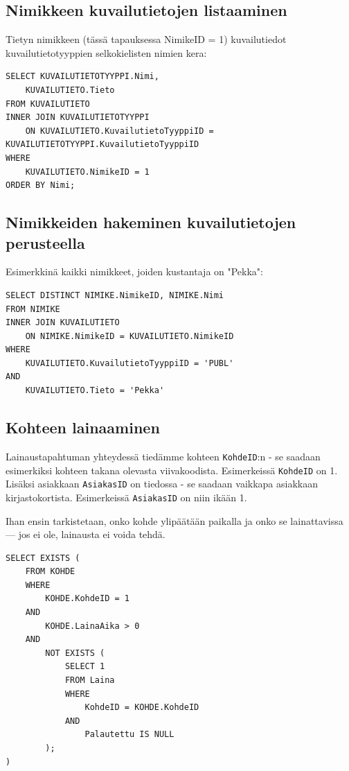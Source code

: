 \documentclass{article}
\begin{document}
\subsection{Nimikkeen kuvailutietojen listaaminen}

Tietyn nimikkeen (tässä tapauksessa NimikeID = 1) kuvailutiedot kuvailutietotyyppien selkokielisten nimien kera:

\begin{lstlisting}
SELECT KUVAILUTIETOTYYPPI.Nimi,
    KUVAILUTIETO.Tieto 
FROM KUVAILUTIETO
INNER JOIN KUVAILUTIETOTYYPPI
    ON KUVAILUTIETO.KuvailutietoTyyppiID = KUVAILUTIETOTYYPPI.KuvailutietoTyyppiID
WHERE
    KUVAILUTIETO.NimikeID = 1
ORDER BY Nimi;
\end{lstlisting}

\subsection{Nimikkeiden hakeminen kuvailutietojen perusteella}

Esimerkkinä kaikki nimikkeet, joiden kustantaja on "Pekka":

\begin{lstlisting}
SELECT DISTINCT NIMIKE.NimikeID, NIMIKE.Nimi
FROM NIMIKE
INNER JOIN KUVAILUTIETO
    ON NIMIKE.NimikeID = KUVAILUTIETO.NimikeID
WHERE
    KUVAILUTIETO.KuvailutietoTyyppiID = 'PUBL'
AND
    KUVAILUTIETO.Tieto = 'Pekka'
\end{lstlisting}

\subsection{Kohteen lainaaminen}

Lainaustapahtuman yhteydessä tiedämme kohteen \texttt{KohdeID}:n - se saadaan esimerkiksi kohteen takana olevasta viivakoodista. Esimerkeissä \texttt{KohdeID} on 1. Lisäksi asiakkaan \texttt{AsiakasID} on tiedossa - se saadaan vaikkapa asiakkaan kirjastokortista. Esimerkeissä \texttt{AsiakasID} on niin ikään 1.

Ihan ensin tarkistetaan, onko kohde ylipäätään paikalla ja onko se lainattavissa --- jos ei ole, lainausta ei voida tehdä.

\begin{lstlisting}
SELECT EXISTS (
    FROM KOHDE
    WHERE
        KOHDE.KohdeID = 1
    AND
        KOHDE.LainaAika > 0
    AND
        NOT EXISTS (
            SELECT 1
            FROM Laina
            WHERE
                KohdeID = KOHDE.KohdeID
            AND
                Palautettu IS NULL
        );
)
\end{lstlisting}
\end{document}

